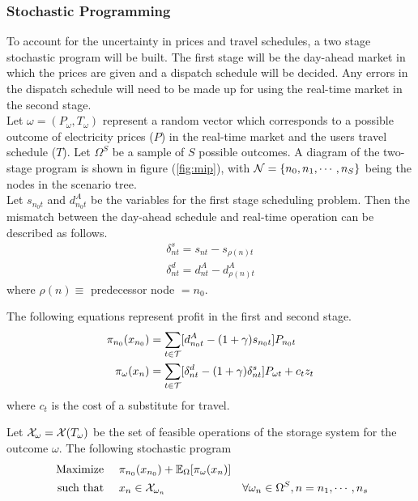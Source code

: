 %


\subsubsection{Stochastic Programming}
To account for the uncertainty in prices and travel schedules, a two stage stochastic program will be built.  The first stage will be the day-ahead market in which the prices are given and a dispatch schedule will be decided.  Any errors in the dispatch schedule will need to be made up for using the real-time market in the second stage. \\

 Let $\omega = (P_\omega, T_\omega)$ represent a random vector which corresponds to a possible outcome of electricity prices ($P$) in the real-time market and the users travel schedule ($T$).  Let $\Omega^S$ be a sample of $S$ possible outcomes.  A diagram of the two-stage program is shown in figure (\ref{fig:mip}), with $ \mathcal{N} = \left\{ n_0, n_1, \cdots, n_S \right\} $ being the nodes in the scenario tree.  \\

Let $s_{n_0 t}$ and $d^A_{n_0 t}$ be the variables for the first stage scheduling problem.  Then the mismatch between the day-ahead schedule and real-time operation can be described as follows.
\begin{align}
\delta^s_{nt} = s_{nt} - s_{\rho(n)t}   \\ 
\delta^d_{nt} = d^A_{nt} - d^A_{\rho(n) t}  
\end{align} 
where $\rho(n) \equiv$ predecessor node $=n_0$.  

The following equations represent profit in the first and second stage.  
\begin{align}
\pi_{n_0}(x_{n_0}) &= \sum_{t \in \mathcal{T}} [ d^A_{n_0t} - (1+\gamma) s_{n_0t} ]  P_{n_0t}  \\  
\pi_\omega ( x_n ) &= \sum_{t \in \mathcal{T}}[ \delta^d_{nt} - (1+\gamma) \delta^s_{nt} ]  P_{\omega t} + c_t z_t
\end{align}
where $c_t$ is the cost of a substitute for travel.

Let $\mathcal{X}_\omega = \mathcal{X}(T_\omega)$ be the set of feasible operations of the storage system for the outcome $\omega$.  The following stochastic program   
\begin{subequations}
\begin{align}
	\mbox{ Maximize } \hspace{10px} & \pi_{n_0}(x_{n_0}) + \Expect_\Omega [ \pi_\omega(x_n) ]  & 	\\
	\mbox{ such that } \hspace{10px} & x_n \in \cX_{\omega_n}  & \forall \omega_n \in \Omega^S, n={n_1, \cdots, n_s}
\end{align}
\label{solve}
\end{subequations}

